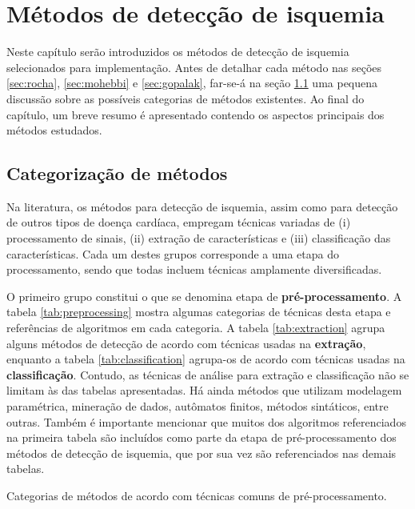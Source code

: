 
\chapter[Métodos de detecção de isquemia]{Métodos de detecção de isquemia}
\thispagestyle{empty}
\label{chap:chapter5}

Neste capítulo serão introduzidos os métodos de detecção de isquemia selecionados para implementação. Antes de detalhar cada método nas seções \ref{sec:rocha}, \ref{sec:mohebbi} e \ref{sec:gopalak}, far-se-á na seção \ref{sec:methods} uma pequena discussão sobre as possíveis categorias de métodos existentes. Ao final do capítulo, um breve resumo é apresentado contendo os aspectos principais dos métodos estudados.

\section{Categorização de métodos}
\label{sec:methods}
Na literatura, os métodos para detecção de isquemia, assim como para detecção de outros tipos de doença cardíaca, empregam técnicas variadas de (i) processamento de sinais, (ii) extração de características e (iii) classificação das características. Cada um destes grupos corresponde a uma etapa do processamento, sendo que todas incluem técnicas amplamente diversificadas.

O primeiro grupo constitui o que se denomina etapa de \textbf{pré-processamento}. A tabela \ref{tab:preprocessing} mostra algumas categorias de técnicas desta etapa e referências de algoritmos em cada categoria. A tabela \ref{tab:extraction} agrupa alguns métodos de detecção de acordo com técnicas usadas na \textbf{extração}, enquanto a tabela \ref{tab:classification} agrupa-os de acordo com técnicas usadas na \textbf{classificação}. Contudo, as técnicas de análise para extração e classificação não se limitam às das tabelas apresentadas. Há ainda métodos que utilizam modelagem paramétrica, mineração de dados, autômatos finitos, métodos sintáticos, entre outras. Também é importante mencionar que muitos dos algoritmos referenciados na primeira tabela são incluídos como parte da etapa de pré-processamento dos métodos de detecção de isquemia, que por sua vez são referenciados nas demais tabelas.

\begin{table}[ht!]
    \centering
    
    \caption[Categorias de métodos de acordo com as técnicas de pré-processamento]{Categorias de métodos de acordo com técnicas comuns de pré-processamento.}
    \label{tab:preprocessing}
\end{table}

